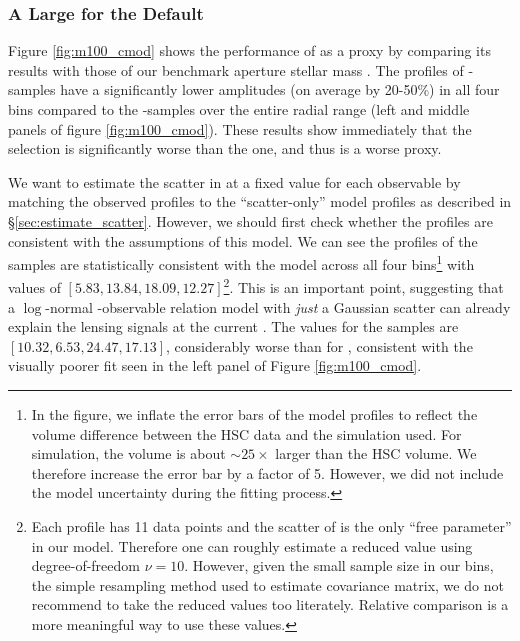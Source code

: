 \documentclass[fleqn,usenatbib,useAMS,english]{mnras}
\begin{document}

\subsubsection{A Large \sigmvir{} for the Default \mcmodel{}}
    \label{sec:m100_cmodel}

    Figure \ref{fig:m100_cmod} shows the performance of \cmodel{} as a \mvir{} proxy by
    comparing its \topn{} results with those of our benchmark aperture stellar mass .
    The \dsigma{} profiles of \mcmodel{}-samples have a significantly lower amplitudes (on average
    by 20-50\%) in all four bins compared to the -samples over the entire radial range (left
    and middle panels of figure \ref{fig:m100_cmod}).
    These results show immediately that the \mcmodel{} selection is significantly worse than the
     one, and thus \mcmodel{} is a worse \mvir{} proxy.

    We want to estimate the scatter in \logmvir{} at a fixed value for each observable by
    matching the observed \dsigma{} profiles to the ``scatter-only'' model profiles as
    described in \S \ref{sec:estimate_scatter}.
    However, we should first check whether the \dsigma{} profiles are consistent with the
    assumptions of this model.
    We can see the \dsigma{} profiles of the  samples are statistically
    consistent with the model across all four bins\footnote{In the figure, we inflate the error bars of the
    model profiles to reflect the volume difference between the HSC data and the simulation
    used. For  simulation, the volume is about $\sim 25 \times$ larger than the HSC
    volume. We therefore increase the error bar by a factor of 5. However, we did not
    include the model uncertainty during the fitting process.} with \chisq{} values of
    $[5.83, 13.84, 18.09, 12.27]$\footnote{Each \dsigma{} profile has 11 data points and
    the scatter of \logmvir{} is the only ``free parameter'' in our model. Therefore one
    can roughly estimate a reduced \chisq{} value using degree-of-freedom $\nu=10$. However,
    given the small sample size in our \topn{} bins, the simple resampling method used to
    estimate covariance matrix, we do not recommend to take the reduced \chisq{} values
    too literately. Relative comparison is a more meaningful way to use these \chisq{} values.}.
    This is an important point, suggesting that a $\log$-normal \mvir{}-observable relation
    model with \emph{just} a Gaussian scatter can already explain the lensing signals at the
    current \snratio{}.
    The \chisq{} values for the \mcmodel{} samples are $[10.32, 6.53, 24.47, 17.13]$,
    considerably worse than for , consistent with the visually poorer fit seen in
    the left panel of Figure \ref{fig:m100_cmod}.
\end{document}
